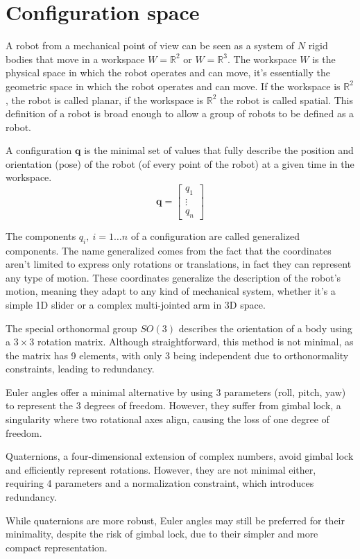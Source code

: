 \chapter{Configuration space}

A robot from a mechanical point of view can be seen as a system of $N$ rigid bodies that move in a workspace $W = \mathbb{R} ^2$ or $W = \mathbb{R} ^3$.
The workspace $W$ is the physical space in which the robot operates and can move, it's essentially the geometric space in which the robot operates and can move.
If the workspace is $\mathbb{R} ^2$, the robot is called planar, if the workspace is $\mathbb{R} ^2$ the robot is called spatial.
This definition of a robot is broad enough to allow a group of robots to be defined as a robot.

\begin{definition}
    A configuration $\bm{q}$ is the minimal set of values that fully describe the position and orientation (pose) of the robot (of every point of the robot) at a given time in the workspace.
    $$
        \bm{q} = \begin{bmatrix}
            q_1    \\
            \vdots \\
            q_n
        \end{bmatrix}
    $$
\end{definition}




The components $q_i, \ i =1\dots n$ of a configuration are called generalized components.
The name generalized comes from the fact that the coordinates aren't limited to express only rotations or translations, in fact they can represent any type of motion.
These coordinates generalize the description of the robot’s motion, meaning they adapt to any kind of mechanical system, whether it’s a simple 1D slider or a complex multi-jointed arm in 3D space.

\begin{warningbox}[Warning]
    The special orthonormal group $SO(3)$ describes the orientation of a body using a $3 \times 3$ rotation matrix. Although straightforward, this method is not minimal, as the matrix has 9 elements, with only 3 being independent due to orthonormality constraints, leading to redundancy.

    Euler angles offer a minimal alternative by using 3 parameters (roll, pitch, yaw) to represent the 3 degrees of freedom. However, they suffer from gimbal lock, a singularity where two rotational axes align, causing the loss of one degree of freedom.

    Quaternions, a four-dimensional extension of complex numbers, avoid gimbal lock and efficiently represent rotations. However, they are not minimal either, requiring 4 parameters and a normalization constraint, which introduces redundancy.

    While quaternions are more robust, Euler angles may still be preferred for their minimality, despite the risk of gimbal lock, due to their simpler and more compact representation.
\end{warningbox}

